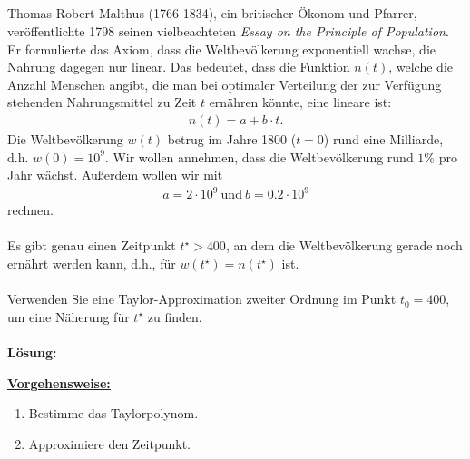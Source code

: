 \subsection*{}
Thomas Robert Malthus (1766-1834), ein britischer Ökonom und Pfarrer, veröffentlichte
1798 seinen vielbeachteten \textit{Essay on the Principle of Population}.
Er formulierte das Axiom, dass die Weltbevölkerung exponentiell wachse, die Nahrung dagegen nur linear. 
Das bedeutet, dass die Funktion $ n(t) $, welche die Anzahl Menschen angibt, die man bei optimaler Verteilung der zur Verfügung stehenden Nahrungsmittel zu Zeit $ t $ ernähren könnte, eine lineare ist:
\begin{align*}
	n(t) = a + b \cdot t.
\end{align*}
Die Weltbevölkerung $ w(t) $ betrug im Jahre 1800 ($ t= 0 $) rund eine Milliarde, d.h. $ w(0) = 10^9 $.
Wir wollen annehmen, dass die Weltbevölkerung rund $ 1\% $ pro Jahr wächst.
Außerdem wollen wir mit
\begin{align*}
	a = 2 \cdot 10^9 \ \textrm{und} \ b = 0.2 \cdot 10^9
\end{align*}
rechnen.\\
\\
Es gibt genau einen Zeitpunkt $ t^\star > 400 $, an dem die Weltbevölkerung gerade noch ernährt werden kann, d.h., für $ w(t^\star)  = n(t^\star )$ ist.\\
\\
Verwenden Sie eine Taylor-Approximation zweiter Ordnung im Punkt $ t_0 = 400 $, um eine Näherung für $ t^\star $ zu finden.
\\ \\
\textbf{Lösung:}
\begin{mdframed}
\underline{\textbf{Vorgehensweise:}}
\renewcommand{\labelenumi}{\theenumi.}
\begin{enumerate}
\item Bestimme das Taylorpolynom. 
\item Approximiere den Zeitpunkt.
\end{enumerate}
\end{mdframed}

